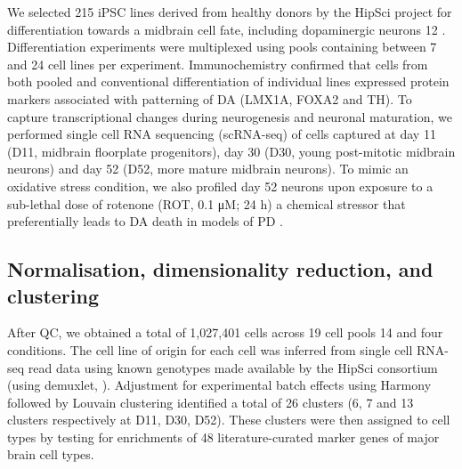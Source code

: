 We selected 215 iPSC lines derived from healthy donors by the HipSci project \cite{kilpinen2017common} for differentiation towards a midbrain cell fate, including dopaminergic neurons 12 \cite{kriks2011dopamine}. 
Differentiation experiments were multiplexed using pools containing between 7 and 24 cell lines per experiment. 
Immunochemistry confirmed that cells from both pooled and conventional differentiation of individual lines expressed protein markers associated with patterning of DA (LMX1A, FOXA2 and TH). 
To capture transcriptional changes during neurogenesis and neuronal maturation, we performed single cell RNA sequencing (scRNA-seq) of cells captured at day 11 (D11, midbrain floorplate progenitors), day 30 (D30, young post-mitotic midbrain neurons) and day 52 (D52, more mature midbrain neurons). 
To mimic an oxidative stress condition, we also profiled day 52 neurons upon exposure to a sub-lethal dose of rotenone (ROT, 0.1 μM; 24 h) a chemical stressor that preferentially leads to DA death in models of PD \cite{xiong2012mitochondrial}.

\subsection{Normalisation, dimensionality reduction, and clustering}

After QC, we obtained a total of 1,027,401 cells across 19 cell pools 14 and four conditions. 
The cell line of origin for each cell was inferred from single cell RNA-seq read data using known genotypes made available by the HipSci consortium (using demuxlet, \cite{kang2018multiplexed}). Adjustment for experimental batch effects using Harmony \cite{korsunsky2019fast} followed by Louvain clustering \cite{blondel2008fast} identified a total of 26 clusters (6, 7 and 13 clusters respectively at D11, D30, D52). 
These clusters were then assigned to cell types by testing for enrichments of 48 literature-curated marker genes of major brain cell types.\\

